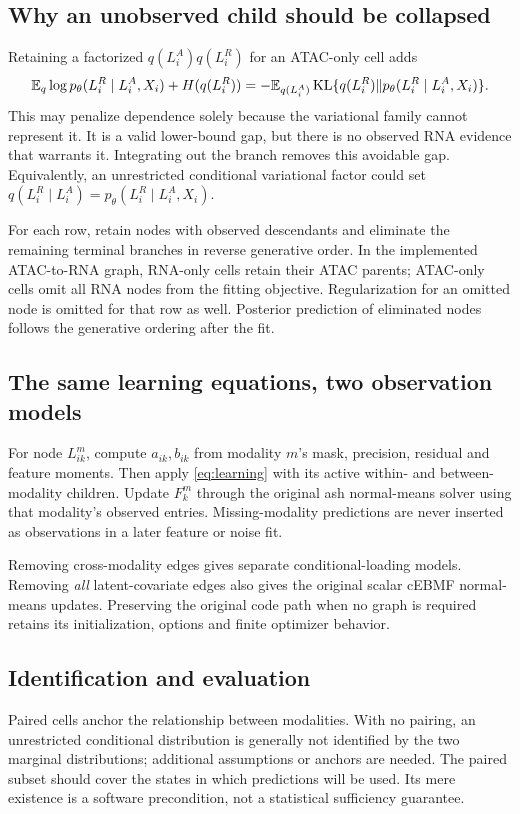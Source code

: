 \clearpage
\subsection{Why an unobserved child should be collapsed}
Retaining a factorized \(q(L_i^A)q(L_i^R)\) for an ATAC-only cell adds
\begin{equation}
\mathbb E_q\log p_\theta(L_i^R\mid L_i^A,X_i)+H(q(L_i^R))
=-\mathbb E_{q(L_i^A)}\operatorname{KL}
\{q(L_i^R)\Vert p_\theta(L_i^R\mid L_i^A,X_i)\}.
\label{eq:missinggap}
\end{equation}
This may penalize dependence solely because the variational family cannot
represent it. It is a valid lower-bound gap, but there is no observed RNA
evidence that warrants it. Integrating out the branch removes this avoidable
gap. Equivalently, an unrestricted conditional variational factor could set
\(q(L_i^R\mid L_i^A)=p_\theta(L_i^R\mid L_i^A,X_i)\).

For each row, retain nodes with observed descendants and eliminate the
remaining terminal branches in reverse generative order. In the implemented
ATAC-to-RNA graph, RNA-only cells retain their ATAC parents; ATAC-only cells
omit all RNA nodes from the fitting objective. Regularization for an omitted
node is omitted for that row as well. Posterior prediction of eliminated
nodes follows the generative ordering after the fit.

\subsection{The same learning equations, two observation models}
For node \(L^m_{ik}\), compute \(a_{ik},b_{ik}\) from modality \(m\)'s mask,
precision, residual and feature moments. Then apply \eqref{eq:learning}
with its active within- and between-modality children. Update \(F^m_k\)
through the original ash normal-means solver using that modality's observed
entries. Missing-modality predictions are never inserted as observations
in a later feature or noise fit.

Removing cross-modality edges gives separate conditional-loading models.
Removing \emph{all} latent-covariate edges also gives the original scalar
cEBMF normal-means updates. Preserving the original code path when no graph
is required retains its initialization, options and finite optimizer behavior.

\subsection{Identification and evaluation}
Paired cells anchor the relationship between modalities. With no pairing,
an unrestricted conditional distribution is generally not identified by the
two marginal distributions; additional assumptions or anchors are needed.
The paired subset should cover the states in which predictions will be used.
Its mere existence is a software precondition, not a statistical sufficiency
guarantee.

